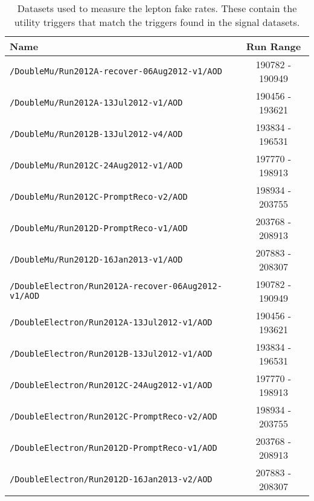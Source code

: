 \begin{table}[hbt]
\caption{\label{tab:App:FRDsets}Datasets used to measure the lepton fake rates. These contain the utility triggers that match the triggers found in the signal datasets.}
\begin{center}
\begin{tabular}{lc}\hline\hline
Name		& Run Range \\ \hline
\verb=/DoubleMu/Run2012A-recover-06Aug2012-v1/AOD=                 &   190782 - 190949\\ 
\verb=/DoubleMu/Run2012A-13Jul2012-v1/AOD=                                  &  190456 - 193621                     \\ 
\verb=/DoubleMu/Run2012B-13Jul2012-v4/AOD=                                  &  193834 - 196531                     \\ 
\verb=/DoubleMu/Run2012C-24Aug2012-v1/AOD=                                &  197770 - 198913 \\  
\verb=/DoubleMu/Run2012C-PromptReco-v2/AOD=                               &  198934 - 203755                     \\ 
\verb=/DoubleMu/Run2012D-PromptReco-v1/AOD=                               &  203768 - 208913  \\
\verb=/DoubleMu/Run2012D-16Jan2013-v1/AOD=                                 &  207883 - 208307  \\

\verb=/DoubleElectron/Run2012A-recover-06Aug2012-v1/AOD=         &   190782 - 190949                    \\ 
\verb=/DoubleElectron/Run2012A-13Jul2012-v1/AOD=                         & 190456 - 193621                      \\ 
\verb=/DoubleElectron/Run2012B-13Jul2012-v1/AOD=                         &  193834 - 196531 \\ 
\verb=/DoubleElectron/Run2012C-24Aug2012-v1/AOD=                       &   197770 - 198913                    \\ 
\verb=/DoubleElectron/Run2012C-PromptReco-v2/AOD=                     &    198934 - 203755                  \\ 
\verb=/DoubleElectron/Run2012D-PromptReco-v1/AOD=                      &  203768 - 208913  \\
\verb=/DoubleElectron/Run2012D-16Jan2013-v2/AOD=                        &   207883 - 208307 \\


\end{tabular}
\end{center}
\end{table}
